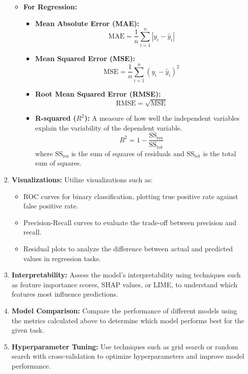 \begin{enumerate}
\begin{itemize}
        \item \textbf{For Regression:}
        \begin{itemize}
            \item \textbf{Mean Absolute Error (MAE):} 
            \[
            \text{MAE} = \frac{1}{n} \sum_{i=1}^{n} |y_i - \hat{y}_i|
            \]
            \item \textbf{Mean Squared Error (MSE):} 
            \[
            \text{MSE} = \frac{1}{n} \sum_{i=1}^{n} (y_i - \hat{y}_i)^2
            \]
            \item \textbf{Root Mean Squared Error (RMSE):} 
            \[
            \text{RMSE} = \sqrt{\text{MSE}}
            \]
            \item \textbf{R-squared (\(R^2\)):} A measure of how well the independent variables explain the variability of the dependent variable.
            \[
            R^2 = 1 - \frac{\text{SS}_{\text{res}}}{\text{SS}_{\text{tot}}}
            \]
            where \(\text{SS}_{\text{res}}\) is the sum of squares of residuals and \(\text{SS}_{\text{tot}}\) is the total sum of squares.
        \end{itemize}
    \end{itemize}

    \item \textbf{Visualizations:}
    Utilize visualizations such as:
    \begin{itemize}
        \item ROC curves for binary classification, plotting true positive rate against false positive rate.
        \item Precision-Recall curves to evaluate the trade-off between precision and recall.
        \item Residual plots to analyze the difference between actual and predicted values in regression tasks.
    \end{itemize}

    \item \textbf{Interpretability:}
    Assess the model's interpretability using techniques such as feature importance scores, SHAP values, or LIME, to understand which features most influence predictions.

    \item \textbf{Model Comparison:}
    Compare the performance of different models using the metrics calculated above to determine which model performs best for the given task.

    \item \textbf{Hyperparameter Tuning:}
    Use techniques such as grid search or random search with cross-validation to optimize hyperparameters and improve model performance.
\end{enumerate}


